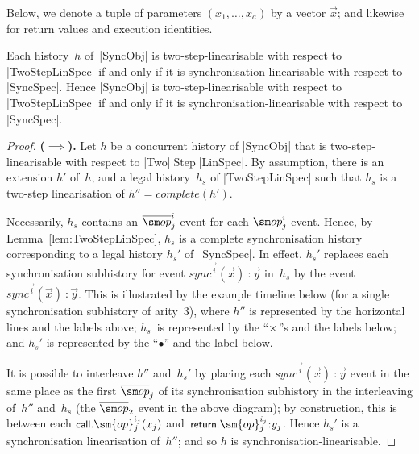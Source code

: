 Below, we denote a tuple of parameters $(x_1,\ldots,x_a)$ by a
vector $\vec{x}$; and likewise for return values and execution identities.
%
\begin{prop}
Each history~$h$ of~|SyncObj| is two-step-linearisable with respect to
|TwoStepLinSpec| if and only if it is synchronisation-linearisable with
respect to |SyncSpec|.  Hence |SyncObj| is two-step-linearisable with respect
to |TwoStepLinSpec| if and only if it is synchronisation-linearisable with
respect to |SyncSpec|.
\end{prop}
%
\begin{proof}
\textbf{($\implies$).}\quad
%
Let $h$ be a concurrent history of |SyncObj| that is two-step-linearisable
with respect to |Two|\-|Step|\-|LinSpec|.  By assumption, there is an
extension $h'$ of~$h$, and a legal history~$h_s$ of |TwoStepLinSpec| such that
$h_s$ is a two-step linearisation of $h'' = complete(h')$.

Necessarily, $h_s$ contains an $\overline{\op}_j^i$ event for each $\op_j^i$
event.  Hence, by Lemma~\ref{lem:TwoStepLinSpec}, $h_s$ is a complete
synchronisation history corresponding to a legal history $h_s'$ of~|SyncSpec|.
In effect, $h_s'$ replaces each synchronisation subhistory for event
$sync^{\vec{i}}(\vec{x})\::\vec{y}$ in~$h_s$ by the event
$sync^{\vec{i}}(\vec{x})\::\vec{y}$.
%
This is illustrated by the example timeline below (for a single
synchronisation subhistory of arity~3), where $h''$ is represented by the
horizontal lines and the labels above; $h_s$~is represented by the
``$\times$''s and the labels below; and $h_s'$ is represented by the
``$\bullet$'' and the label below.
%
\begin{center}
\end{center}
%
It is possible to interleave $h''$ and~$h_s'$ by placing each
$sync^{\vec{i}}(\vec{x}) \:: \vec{y}$ event in the same place as the first
$\overline{\op}_j$ of its synchronisation subhistory in the interleaving
of~$h''$ and~$h_s$ (the $\overline{\op}_2$ event in the above diagram); by
construction, this is between each $\call.\sm{op}_j^{i_j}(x_j)$
and~$\return.\sm{op}_j^{i_j} \:: y_j$.
%
Hence $h_s'$ is a synchronisation linearisation of~$h''$; and so $h$ is
synchronisation-linearisable.


\end{proof}
